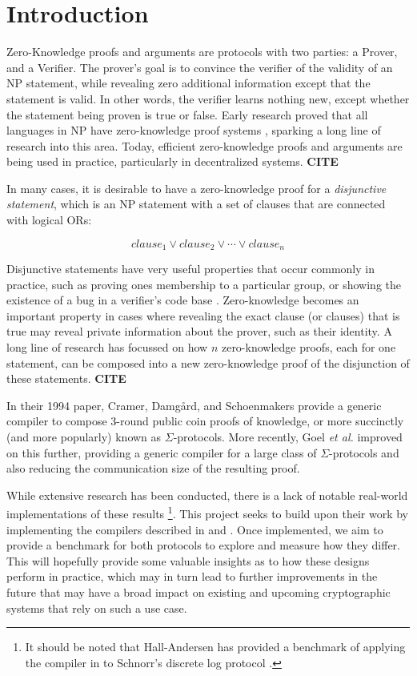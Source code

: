 \section{Introduction}

Zero-Knowledge proofs and arguments \cite{GMR85} are protocols with two parties: a Prover, and a Verifier. 
The prover's goal is to convince the verifier of the validity of an NP statement, while revealing zero additional 
information except that the statement is valid. In other words, the verifier learns nothing new, except whether 
the statement being proven is true or false. Early research proved that all languages in NP have zero-knowledge 
proof systems \cite{DBLP:conf/focs/GoldreichMW86}, sparking a long line of research into this area. Today, 
efficient zero-knowledge proofs and arguments are being used in practice, particularly in decentralized systems. \textbf{CITE}

In many cases, it is desirable to have a zero-knowledge proof for a \textit{disjunctive statement}, which is an NP 
statement with a set of clauses that are connected with logical ORs:

$$
clause_1 \lor clause_2 \lor \cdots \lor clause_n
$$

Disjunctive statements have very useful properties that occur commonly in practice, such as proving ones membership 
to a particular group, or showing the existence of a bug in a verifier's code base \cite{StackedGF}. Zero-knowledge 
becomes an important property in cases where revealing the exact clause (or clauses) that is true may reveal 
private information about the prover, such as their identity. A long line of research has focussed on how $n$ 
zero-knowledge proofs, each for one statement, can be composed into a new zero-knowledge proof of the disjunction 
of these statements. \textbf{CITE} 

In their 1994 paper, Cramer, Damg{\aa}rd, and Schoenmakers \cite{CDS94} provide a generic compiler to compose 
3-round public coin proofs of knowledge, or more succinctly (and more popularly) known as $\Sigma$-protocols. %
More recently, Goel {\em et al.} \cite{StackingSigmas} improved on this further, providing a generic compiler for a 
large class of $\Sigma$-protocols and also reducing the communication size of the resulting proof. 

While extensive research has been conducted, there is a lack of notable real-world implementations of these results
\footnote{It should be noted that Hall-Andersen \cite{MHAStackSig} has provided a benchmark of applying the compiler in 
\cite{StackingSigmas} to Schnorr's discrete log protocol \cite{Schnorr}.}. This project seeks to build upon their work by 
implementing the compilers described in \cite{CDS94} and \cite{StackingSigmas}. Once implemented, we aim to provide a 
benchmark for both protocols to explore and measure how they differ. This will hopefully provide some valuable insights 
as to how these designs perform in practice, which may in turn lead to further improvements in the future that may have a 
broad impact on existing and upcoming cryptographic systems that rely on such a use case. 

